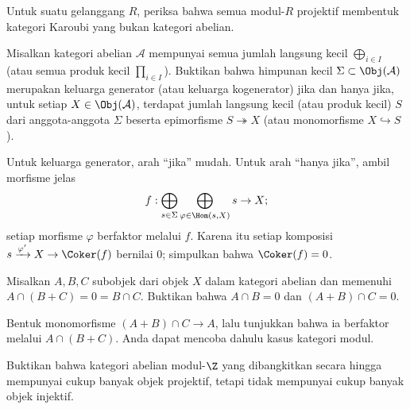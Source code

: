 \begin{Exercises}
	\item Untuk suatu gelanggang $R$, periksa bahwa semua modul-$R$ projektif
	membentuk kategori Karoubi yang bukan kategori abelian.

	\item Misalkan kategori abelian $\mathcal{A}$ mempunyai semua jumlah
	langsung kecil $\bigoplus_{i\in I}$ (atau semua produk kecil
	$\prod_{i\in I}$). Buktikan bahwa himpunan kecil
	$\Sigma\subset\Obj(\mathcal{A})$ merupakan keluarga generator (atau
	keluarga kogenerator) jika dan hanya jika, untuk setiap
	$X\in\Obj(\mathcal{A})$, terdapat jumlah langsung kecil (atau produk kecil)
		$S$ dari anggota-anggota $\Sigma$ beserta epimorfisme $S\twoheadrightarrow X$
	(atau monomorfisme $X\hookrightarrow S$).

	\begin{hint}
		Untuk keluarga generator, arah ``jika'' mudah. Untuk arah ``hanya jika'',
		ambil morfisme jelas
		\[ f: \bigoplus_{s \in \Sigma} \bigoplus_{\varphi \in \Hom(s, X)} s \to X; \]
		setiap morfisme $\varphi$ berfaktor melalui $f$. Karena itu setiap
		komposisi $s\xrightarrow{\varphi'}X\to\Coker(f)$ bernilai $0$; simpulkan
		bahwa $\Coker(f)=0$.
	\end{hint}

	\item Misalkan $A,B,C$ subobjek dari objek $X$ dalam kategori abelian dan
	memenuhi $A\cap(B+C)=0=B\cap C$. Buktikan bahwa $A\cap B=0$ dan
	$(A+B)\cap C=0$.

	\begin{hint}
		Bentuk monomorfisme $(A+B)\cap C\to A$, lalu tunjukkan bahwa ia berfaktor
		melalui $A\cap(B+C)$. Anda dapat mencoba dahulu kasus kategori modul.
	\end{hint}

	\item Buktikan bahwa kategori abelian modul-$\Z$ yang dibangkitkan secara hingga
	mempunyai cukup banyak objek projektif, tetapi tidak mempunyai cukup banyak
	objek injektif.


\end{Exercises}
